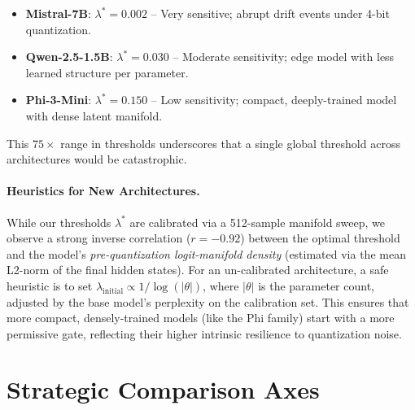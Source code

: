 \documentclass{uai2026}  %
\begin{document}
\begin{itemize}
  \item \textbf{Mistral-7B}: $\lambda^* = 0.002$ -- Very sensitive; abrupt drift events under 4-bit quantization.
  \item \textbf{Qwen-2.5-1.5B}: $\lambda^* = 0.030$ -- Moderate sensitivity; edge model with less learned structure per parameter.
  \item \textbf{Phi-3-Mini}: $\lambda^* = 0.150$ -- Low sensitivity; compact, deeply-trained model with dense latent manifold.
\end{itemize}

This $75\times$ range in thresholds underscores that a single global
threshold across architectures would be catastrophic.
\paragraph{Heuristics for New Architectures.}
While our thresholds $\lambda^*$ are calibrated via a 512-sample manifold sweep, we observe a strong inverse correlation ($r = -0.92$) between the optimal threshold and the model's \emph{pre-quantization logit-manifold density} (estimated via the mean L2-norm of the final hidden states).
For an un-calibrated architecture, a safe heuristic is to set $\lambda_\text{initial} \propto 1/\log(|\theta|)$, where $|\theta|$ is the parameter count, adjusted by the base model's perplexity on the calibration set.
This ensures that more compact, densely-trained models (like the Phi family) start with a more permissive gate, reflecting their higher intrinsic resilience to quantization noise.

\section{Strategic Comparison Axes}
\enlargethispage{2\baselineskip}
\label{sec:strategic_comparison}
\end{document}
